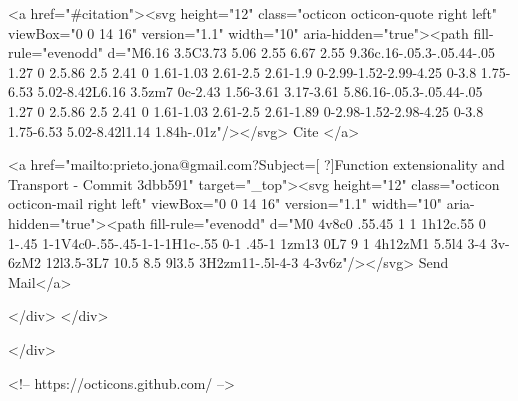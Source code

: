       <a  href="#citation"><svg height="12" class="octicon octicon-quote right left" viewBox="0 0 14 16" version="1.1" width="10" aria-hidden="true"><path fill-rule="evenodd" d="M6.16 3.5C3.73 5.06 2.55 6.67 2.55 9.36c.16-.05.3-.05.44-.05 1.27 0 2.5.86 2.5 2.41 0 1.61-1.03 2.61-2.5 2.61-1.9 0-2.99-1.52-2.99-4.25 0-3.8 1.75-6.53 5.02-8.42L6.16 3.5zm7 0c-2.43 1.56-3.61 3.17-3.61 5.86.16-.05.3-.05.44-.05 1.27 0 2.5.86 2.5 2.41 0 1.61-1.03 2.61-2.5 2.61-1.89 0-2.98-1.52-2.98-4.25 0-3.8 1.75-6.53 5.02-8.42l1.14 1.84h-.01z"/></svg> Cite
      </a>

      <a href="mailto:prieto.jona@gmail.com?Subject=[ ?]Function extensionality and Transport - Commit 3dbb591" target="_top"><svg height="12" class="octicon octicon-mail right left" viewBox="0 0 14 16" version="1.1" width="10" aria-hidden="true"><path fill-rule="evenodd" d="M0 4v8c0 .55.45 1 1 1h12c.55 0 1-.45 1-1V4c0-.55-.45-1-1-1H1c-.55 0-1 .45-1 1zm13 0L7 9 1 4h12zM1 5.5l4 3-4 3v-6zM2 12l3.5-3L7 10.5 8.5 9l3.5 3H2zm11-.5l-4-3 4-3v6z"/></svg> Send Mail</a>

    </div>
  </div>

</div>

<!-- https://octicons.github.com/ -->





